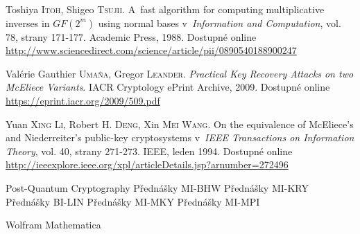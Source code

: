 \documentclass[thesis=M,czech,hidelinks]{FITthesis}[2012/06/26]
\newcommand{\0}{{\textcolor[gray]{0.80}{0}}}
\begin{document}
\begin{thebibliography}{99}
        Toshiya \textsc{Itoh}, Shigeo \textsc{Tsujii}. A~fast algorithm for
        computing multiplicative inverses in $GF(2^m)$ using normal bases
        v~\emph{Information and Computation}, vol. 78, strany 171-177. Academic
        Press, 1988.  Dostupné online
        \url{http://www.sciencedirect.com/science/article/pii/0890540188900247}

        Valérie Gauthier \textsc{Umaña}, Gregor \textsc{Leander}.
        \emph{Practical Key Recovery Attacks on two McEliece Variants}.
        IACR Cryptology ePrint Archive, 2009.  Dostupné online
        \url{https://eprint.iacr.org/2009/509.pdf}

        Yuan \textsc{Xing Li}, Robert H. \textsc{Deng}, Xin \textsc{Mei Wang}.
        On the equivalence of McEliece's and Niederreiter's public-key
        cryptosystems v~\emph{IEEE Transactions on Information Theory}, vol. 40,
        strany 271-273. IEEE, leden 1994. Dostupné online
        \url{http://ieeexplore.ieee.org/xpl/articleDetails.jsp?arnumber=272496}

        Post-Quantum Cryptography
     Přednášky MI-BHW
     Přednášky MI-KRY
     Přednášky BI-LIN
     Přednášky MI-MKY
     Přednášky MI-MPI

     Wolfram Mathematica
\end{thebibliography}

\appendix

\end{document}
